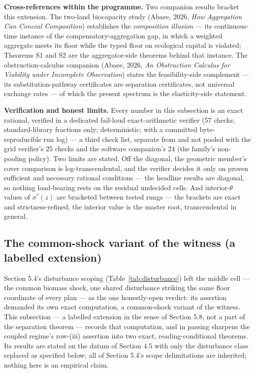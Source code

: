 \documentclass[3p,11pt]{elsarticle}
\begin{document}
\textbf{Cross-references within the programme.} Two companion results
bracket this extension. The two-land biocapacity study (Abaee, 2026,
\emph{How Aggregation Can Conceal Composition}) establishes the
\emph{composition illusion} --- its continuous-time instance of the
compensatory-aggregation gap, in which a weighted aggregate meets its
floor while the typed floor on ecological capital is violated; Theorems S1
and S2 are the aggregator-side theorems behind that instance. The
obstruction-calculus companion (Abaee, 2026, \emph{An Obstruction
Calculus for Viability under Incomplete Observation}) states the
feasibility-side complement --- its substitution-pathway certificates are
separation certificates, not universal exchange rates --- of which the
present spectrum is the elasticity-side statement.

\textbf{Verification and honest limits.} Every number in this subsection
is an exact rational, verified in a dedicated fail-loud exact-arithmetic
verifier (57 checks; standard-library fractions only; deterministic; with
a committed byte-reproducible run log) --- a third check list, separate
from and not pooled with the grid verifier's 25 checks and the software
companion's 24 (the family's non-pooling policy). Two limits are stated.
Off the diagonal, the geometric member's cover comparison is
log-transcendental, and the verifier decides it only on proven sufficient
and necessary rational conditions --- the headline results are diagonal,
so nothing load-bearing rests on the residual undecided cells. And
interior-\(\theta\) values of \(\sigma^*(z)\) are bracketed between
tested rungs --- the brackets are exact and strictness-refined; the
interior value is the master root, transcendental in general.

\subsection{The common-shock variant of the witness (a
labelled extension)}\label{common-shock-variant}

Section 5.4's disturbance scoping (Table~\ref{tab:disturbance}) left the
middle cell --- the common biomass shock, one shared disturbance striking
the same floor coordinate of every plan --- as the one honestly-open
verdict: its assertion demanded its own exact computation, a common-shock
variant of the witness. This subsection --- a labelled extension in the
sense of Section 5.8, not a part of the separation theorem --- records
that computation, and in passing sharpens the coupled regime's row-(iii)
assertion into two exact, reading-conditional theorems. Its results are
stated on the datum of Section 4.5 with only the disturbance class
replaced as specified below; all of Section 5.4's scope delimitations are
inherited; nothing here is an empirical claim.
\end{document}
